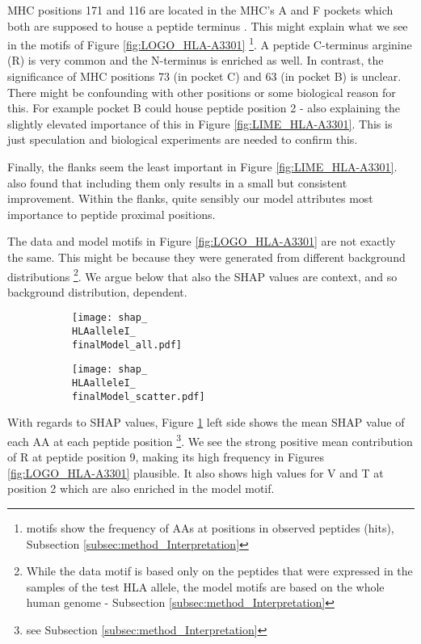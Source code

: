 \documentclass[msc,deptreport,ai]{infthesis} %
\newcommand{\finalModel}{epoch=4-step=3648186}
\newcommand{\HLAalleleI}{HLA-A3301}
\begin{document}
				\gls{MHC} positions 171 and 116 are located in the \gls{MHC}'s A and F pockets \cite{van_deutekom_zooming_2015} which both are supposed to house a peptide terminus \cite{stryhn_longer_2000}. This might explain what we see in the motifs of Figure \ref{fig:LOGO_\HLAalleleI} \footnote{motifs show the frequency of \glspl{AA} at positions in observed peptides (hits), Subsection \ref{subsec:method_Interpretation}}. A peptide C-terminus arginine (R) is very common and the N-terminus is enriched as well. In contrast, the significance of \gls{MHC} positions 73 (in pocket C) and 63 (in pocket B) is unclear. There might be confounding with other positions or some biological reason for this. For example pocket B could house peptide position 2 - also explaining the slightly elevated importance of this in Figure \ref{fig:LIME_\HLAalleleI}. This is just speculation and biological experiments are needed to confirm this.

				Finally, the flanks seem the least important in Figure \ref{fig:LIME_\HLAalleleI}. \cite{odonnell_mhcflurry_2020} also found that including them only results in a small but consistent improvement. Within the flanks, quite sensibly our model attributes most importance to peptide proximal positions.

				The data and model motifs in Figure \ref{fig:LOGO_\HLAalleleI} are not exactly the same. This might be because they were generated from different background distributions \footnote{While the data motif is based only on the peptides that were expressed in the samples of the test \gls{HLA} allele, the model motifs are based on the whole human genome - Subsection \ref{subsec:method_Interpretation}}. We argue below that also the \gls{SHAP} values are context, and so background distribution, dependent.

				\begin{figure}[H]
				\begin{subfigure}{.5\textwidth}
					\centering
					\texttt{[image: shap\_\\HLAalleleI\_\\finalModel\_all.pdf]}
				\end{subfigure}
				\begin{subfigure}{.5\textwidth}
					\centering
					\texttt{[image: shap\_\\HLAalleleI\_\\finalModel\_scatter.pdf]}
				\end{subfigure}
				\captionof{figure}{Mean \gls{SHAP} values (x 100) for \HLAalleleI examples}
				\label{fig:SHAP_\HLAalleleI}
				\end{figure}

				With regards to \gls{SHAP} values, Figure \ref{fig:SHAP_\HLAalleleI} left side shows the mean \gls{SHAP} value of each \gls{AA} at each peptide position \footnote{see Subsection \ref{subsec:method_Interpretation}}. We see the strong positive mean contribution of R at peptide position 9, making its high frequency in Figures \ref{fig:LOGO_\HLAalleleI} plausible. It also shows high values for V and T at position 2 which are also enriched in the model motif. \\
\end{document}
